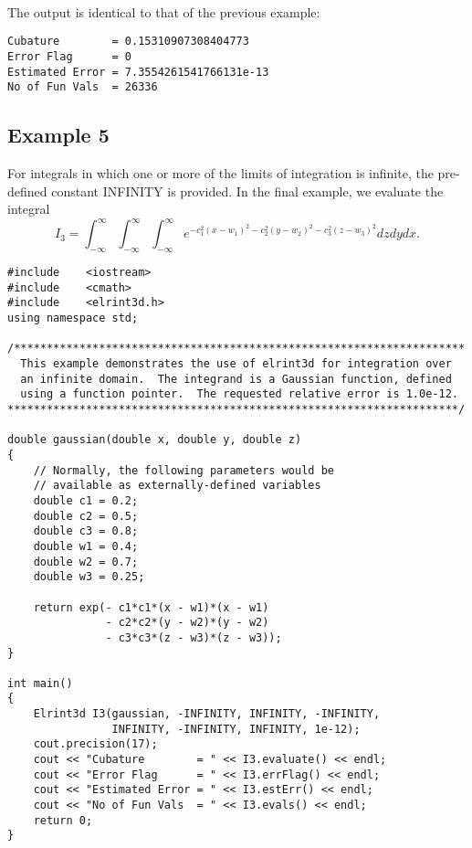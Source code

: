 \documentclass[10pt]{article}
\begin{document}
\ 

\noindent The output is identical to that of the previous example:

\begin{verbatim}
Cubature        = 0.15310907308404773
Error Flag      = 0
Estimated Error = 7.3554261541766131e-13
No of Fun Vals  = 26336
\end{verbatim}

\subsection{Example 5}

For integrals in which one or more of the limits of integration is infinite, the pre-defined constant INFINITY is provided.  In the final example, we evaluate the integral 
$$
I_3=\int_{-\infty}^{\infty}\int_{-\infty}^{\infty}\int_{-\infty}^{\infty}e^{-c_1^2(x-w_1)^2-c_2^2(y-w_2)^2-c_3^2(z-w_3)^2}dzdydx.
$$

\begin{verbatim}
#include    <iostream>
#include    <cmath>
#include    <elrint3d.h>
using namespace std;

/*********************************************************************
  This example demonstrates the use of elrint3d for integration over 
  an infinite domain.  The integrand is a Gaussian function, defined
  using a function pointer.  The requested relative error is 1.0e-12.
*********************************************************************/

double gaussian(double x, double y, double z)
{
    // Normally, the following parameters would be   
    // available as externally-defined variables 
    double c1 = 0.2;
    double c2 = 0.5;
    double c3 = 0.8;
    double w1 = 0.4;
    double w2 = 0.7;
    double w3 = 0.25;
    
    return exp(- c1*c1*(x - w1)*(x - w1)
               - c2*c2*(y - w2)*(y - w2)
               - c3*c3*(z - w3)*(z - w3));
}

int main()
{
    Elrint3d I3(gaussian, -INFINITY, INFINITY, -INFINITY, 
                INFINITY, -INFINITY, INFINITY, 1e-12);
    cout.precision(17);
    cout << "Cubature        = " << I3.evaluate() << endl;
    cout << "Error Flag      = " << I3.errFlag() << endl;
    cout << "Estimated Error = " << I3.estErr() << endl;
    cout << "No of Fun Vals  = " << I3.evals() << endl;    
    return 0;
}
\end{verbatim}

\ 
\end{document}
